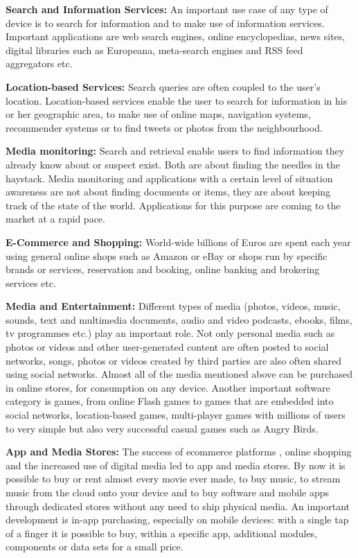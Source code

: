 \documentclass[10pt, plain]{../../metanetpaper}
\begin{document}
\begin{multicols}{2}
\textbf{Search and Information Services:} An important use case of any type of device is to search for information and to make use of information services. Important applications are web search engines, online encyclopedias, news sites, digital libraries such as Europeana, meta-search engines and RSS feed aggregators etc.

\textbf{Location-based Services:} Search queries are often coupled to the user's location. Location-based services enable the user to search for information in his or her geographic area, to make use of online maps, navigation systems, recommender systems or to find tweets or photos from the neighbourhood.

\textbf{Media monitoring:} Search and retrieval enable users to find information they already know about or suspect exist. Both are about finding the needles in the haystack. Media monitoring and applications with a certain level of situation awareness are not about finding documents or items, they are about keeping track of the state of the world. Applications for this purpose are coming to the market at a rapid pace.

\textbf{E-Commerce and Shopping:} World-wide billions of Euros are spent each year using general online shops such as Amazon or eBay or shops run by specific brands or services, reservation and booking, online banking and brokering services etc. 

\textbf{Media and Entertainment:} Different types of media (photos, videos, music, sounds, text and multimedia documents, audio and video podcasts, ebooks, films, tv programmes etc.) play an important role. Not only personal media such as photos or videos and other user-generated content are often posted to social networks, songs, photos or videos created by third parties are also often shared using social networks. Almost all of the media mentioned above can be purchased in online stores, for consumption on any device. Another important software category is games, from online Flash games to games that are embedded into social networks, location-based games, multi-player games with millions of users to very simple but also very successful casual games such as Angry Birds.

\textbf{App and Media Stores:} The success of ecommerce platforms \cite{bruegel12}, online shopping and the increased use of digital media led to app and media stores. By now it is possible to buy or rent almost every movie ever made, to buy music, to stream music from the cloud onto your device and to buy software and mobile apps through dedicated stores without any need to ship physical media. An important development is in-app purchasing, especially on mobile devices: with a single tap of a finger it is possible to buy, within a specific app, additional modules, components or data sets for a small price.


\end{multicols}
\end{document}
